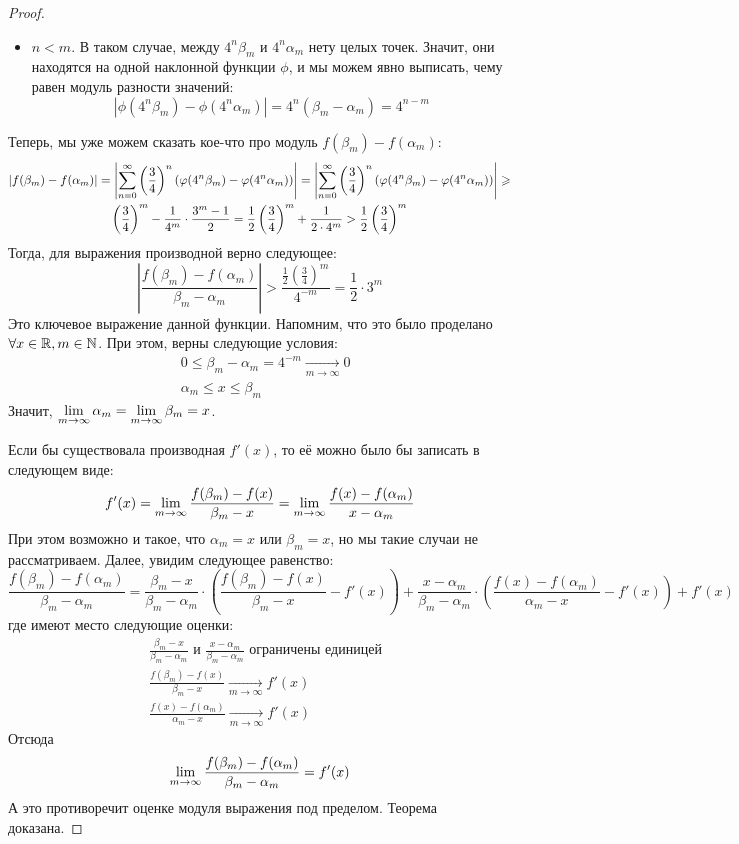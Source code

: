 \begin{proof}
\begin{itemize}
		\item $n < m$. В таком случае, между $4^n \beta_m$ и $4^n \alpha_m$ нету целых точек. Значит, они находятся на одной наклонной функции $\phi$, и мы можем явно выписать, чему равен модуль разности значений:
		\[
			|\phi(4^n\beta_m) - \phi(4^n\alpha_m)| = 4^n(\beta_m - \alpha_m) = 4^{n - m}
		\]
	\end{itemize}

	Теперь, мы уже можем сказать кое-что про модуль $f(\beta_m) - f(\alpha_m)$:
	\begin{multline*}
		|f(\beta_m) - f(\alpha_m)| = \left|\sum_{n = 0}^\infty \left(\frac{3}{4}\right)^n (\varphi(4^n\beta_m) - \varphi(4^n\alpha_m))\right| = \left|\sum_{n = 0}^\infty \left(\frac{3}{4}\right)^n(\varphi(4^n\beta_m) - \varphi(4^n\alpha_m))\right| \geqslant
		\\
		\left(\frac{3}{4}\right)^m - \frac{1}{4^m} \cdot \frac{3^m - 1}{2} = \frac{1}{2}\left(\frac{3}{4}\right)^m + \frac{1}{2 \cdot 4^m} > \frac{1}{2}\left(\frac{3}{4}\right)^m
	\end{multline*}
	Тогда, для выражения производной верно следующее:
	\[
		\left|\frac{f(\beta_m) - f(\alpha_m)}{\beta_m - \alpha_m}\right| > \frac{\frac{1}{2}\left(\frac{3}{4}\right)^m}{4^{-m}} = \frac{1}{2} \cdot 3^m
	\]
	Это ключевое выражение данной функции. Напомним, что это было проделано $\forall x \in \mathbb{R}, m \in \mathbb{N}$. При этом, верны следующие условия:
	\begin{align*}
		&{0 \le \beta_m - \alpha_m = 4^{-m} \xrightarrow[m \to \infty]{} 0}
		\\
		&{\alpha_m \le x \le \beta_m}
	\end{align*}
	Значит, $\lim\limits_{m \to \infty} \alpha_m = \lim\limits_{m \to \infty} \beta_m = x$.
	
	Если бы существовала производная $f'(x)$, то её можно было бы записать в следующем виде:
	\[
		f'(x) = \lim\limits_{m \to \infty} \frac{f(\beta_m) - f(x)}{\beta_m - x} = \lim\limits_{m \to \infty} \frac{f(x) - f(\alpha_m)}{x - \alpha_m}
	\]
	При этом возможно и такое, что $\alpha_m = x$ или $\beta_m = x$, но мы такие случаи не рассматриваем. Далее, увидим следующее равенство:
	\[
		\frac{f(\beta_m) - f(\alpha_m)}{\beta_m - \alpha_m} = \frac{\beta_m - x}{\beta_m - \alpha_m} \cdot \left(\frac{f(\beta_m) - f(x)}{\beta_m - x} - f'(x)\right) + \frac{x - \alpha_m}{\beta_m - \alpha_m} \cdot \left(\frac{f(x) - f(\alpha_m)}{\alpha_m - x} - f'(x)\right) + f'(x)
	\]
	где имеют место следующие оценки:
	\begin{align*}
		&{\frac{\beta_m - x}{\beta_m - \alpha_m} \text{ и } \frac{x - \alpha_m}{\beta_m - \alpha_m} \text{ ограничены единицей}}
		\\
		&{\frac{f(\beta_m) - f(x)}{\beta_m - x} \xrightarrow[m \to \infty]{} f'(x)}
		\\
		&{\frac{f(x) - f(\alpha_m)}{\alpha_m - x} \xrightarrow[m \to \infty]{} f'(x)}
	\end{align*}
	Отсюда
	\[
		\lim\limits_{m \to \infty} \frac{f(\beta_m) - f(\alpha_m)}{\beta_m - \alpha_m} = f'(x)
	\]
	А это противоречит оценке модуля выражения под пределом. Теорема доказана.
\end{proof}


